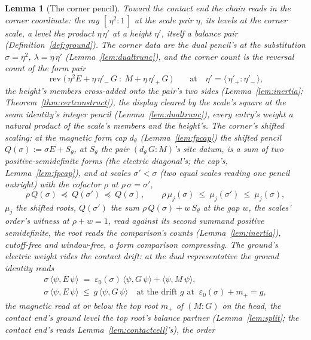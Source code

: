 \documentclass[11pt]{article}
\newtheorem{lemma}{Lemma}
\theoremstyle{definition}
\begin{document}
\begin{lemma}[The corner pencil]\label{lem:corner}
Toward the contact end the chain reads in the \emph{corner
coordinate}: the ray $[\,\eta^2:1\,]$ at the scale pair $\eta$,
its levels at the \emph{corner scale}, a level the product
$\eta\,\eta'$ at a \emph{height} $\eta'$, itself a balance pair
(Definition~\ref{def:ground}). The corner data are the dual
pencil's at the substitution $\sigma=\eta^2$,
$\lambda=\eta\,\eta'$ (Lemma~\ref{lem:dualtrunc}), and the corner
count is the reversal count of the form pair
\[
\operatorname{rev}\big(\,\eta^2E+\eta\,\eta'_-\,G\ :\
M+\eta\,\eta'_+\,G\,\big)
\qquad\text{at}\quad
\eta'=\langle\,\eta'_+\!:\!\eta'_-\,\rangle ,
\]
the height's members cross-added onto the pair's two sides
(Lemma~\ref{lem:inertia}; Theorem~\ref{thm:certconstruct}), the
display cleared by the scale's square at the seam identity's
integer pencil (Lemma~\ref{lem:dualtrunc}), every entry's weight a
natural product of the scale's members and the height's. The
corner's \emph{shifted scaling}: at the magnetic form
cap $d_\theta$ (Lemma~\ref{lem:fpcap}) the shifted pencil
$Q(\sigma):=\sigma E+S_\theta$, at $S_\theta$ the pair
$(d_\theta\,G\!:\!M)$'s site datum, is a sum of two
positive-semidefinite forms (the electric diagonal's; the cap's,
Lemma~\ref{lem:fpcap}), and at scales $\sigma'<\sigma$ (two equal
scales reading one pencil outright) with the cofactor $\rho$
at $\rho\,\sigma=\sigma'$,
\[
\rho\,Q(\sigma)\ \preceq\ Q(\sigma')\ \preceq\ Q(\sigma) ,
\qquad
\rho\,\mu_j(\sigma)\ \le\ \mu_j(\sigma')\ \le\
\mu_j(\sigma) ,
\]
$\mu_j$ the shifted roots, $Q(\sigma')$ the sum
$\rho\,Q(\sigma)+w\,S_\theta$ at the gap $w$, the scales' order's
witness at $\rho+w=1$, read
against its second summand positive semidefinite, the root
reads the comparison's counts
(Lemma~\ref{lem:inertia}), cutoff-free and window-free, a form
comparison compressing. The ground's electric weight rides the
\emph{contact drift}: at the dual representative the ground identity
reads
\begin{gather*}
\sigma\,\langle\psi,E\,\psi\rangle
\;=\;\varepsilon_0(\sigma)\,\langle\psi,G\,\psi\rangle
+\langle\psi,M\,\psi\rangle ,\\
\sigma\,\langle\psi,E\,\psi\rangle\ \le\
g\,\langle\psi,G\,\psi\rangle
\quad\text{at the drift $g$ at }\
\varepsilon_0(\sigma)+m_+=g ,
\end{gather*}
the magnetic read at or below the top root $m_+$ of $(M\!:\!G)$ on
the head, the contact end's ground level the top root's
balance partner (Lemma~\ref{lem:split}; the
contact end's reads Lemma~\ref{lem:contactcell}'s), the order

\end{lemma}
\end{document}
